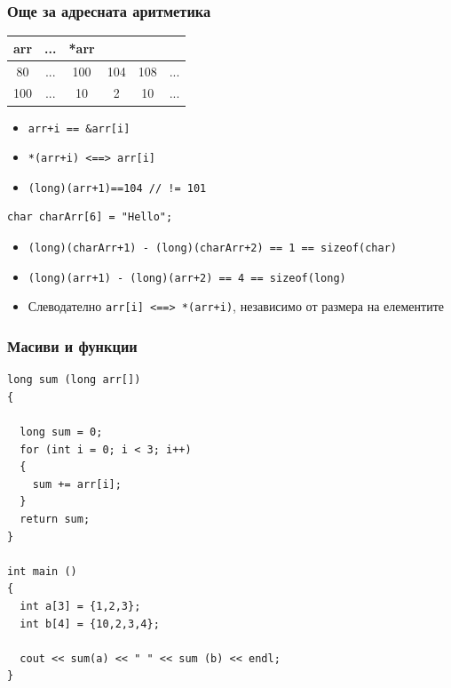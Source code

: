 \documentclass{beamer}
\begin{document}
\begin{frame}[fragile]
\frametitle{Още за адресната аритметика}


\begin{tabular} {c | c | c | c | c | c }

arr &... &*arr \\\hline
80  &... & 100 & 104 & 108 &... \\\hline
100 &... & 10   & 2   & 10   &... \\\hline
  
\end{tabular}

\vspace{15px}

\begin{itemize}
\item \texttt{arr+i == \&arr[i]}
\pause
\item \texttt{*(arr+i) <==> arr[i]}
\pause
\item \texttt{(long)(arr+1)==104 // != 101}
\end{itemize}

\pause

\begin{flushleft}
\begin{lstlisting}
char charArr[6] = "Hello";
\end{lstlisting}
\end{flushleft}

\begin{itemize}
  \item \texttt{(long)(charArr+1) - (long)(charArr+2) == 1 == sizeof(char)}
  \item \texttt{(long)(arr+1) - (long)(arr+2) == 4 == sizeof(long)}
  \item Слеводателно \texttt{arr[i] <==> *(arr+i)}, независимо от размера на елементите
\end{itemize}


\end{frame}




\begin{frame}[fragile]
\frametitle{Масиви и функции}

\begin{flushleft}
\begin{lstlisting}
long sum (long arr[])
{
  
  long sum = 0;
  for (int i = 0; i < 3; i++)
  {
    sum += arr[i];
  }
  return sum;
}

int main ()
{
  int a[3] = {1,2,3};
  int b[4] = {10,2,3,4};

  cout << sum(a) << " " << sum (b) << endl;
}

\end{lstlisting}
\end{flushleft}

\end{frame}
\end{document}

